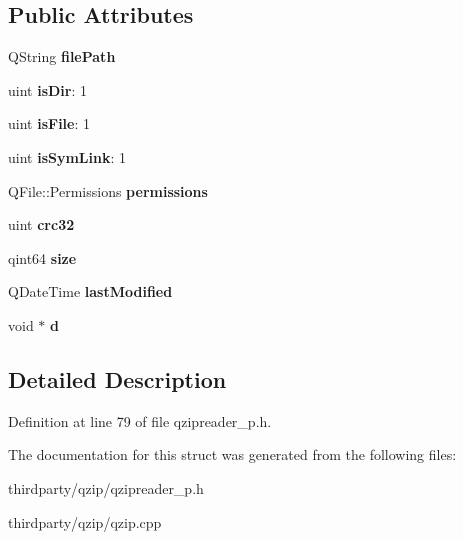 \subsection*{Public Attributes}
\begin{DoxyCompactItemize}
\item 
\mbox{\label{struct_m_q_zip_reader_1_1_file_info_a24b0d40e79c25b4dff99b345cae20b37}} 
Q\+String {\bfseries file\+Path}
\item 
\mbox{\label{struct_m_q_zip_reader_1_1_file_info_a605dfe4eaea865342967e710da5fcc3e}} 
uint {\bfseries is\+Dir}\+: 1
\item 
\mbox{\label{struct_m_q_zip_reader_1_1_file_info_a56b06e7adc978296966209241380faef}} 
uint {\bfseries is\+File}\+: 1
\item 
\mbox{\label{struct_m_q_zip_reader_1_1_file_info_a473414ed6a6d76b523057511a0c5818f}} 
uint {\bfseries is\+Sym\+Link}\+: 1
\item 
\mbox{\label{struct_m_q_zip_reader_1_1_file_info_a593579d29d6f3ac472352d2c2c1a8df6}} 
Q\+File\+::\+Permissions {\bfseries permissions}
\item 
\mbox{\label{struct_m_q_zip_reader_1_1_file_info_a084e35e00a4671ea44536cfd83ab51c2}} 
uint {\bfseries crc32}
\item 
\mbox{\label{struct_m_q_zip_reader_1_1_file_info_ad6fe7cc789885692c4e4216bfeeb6786}} 
qint64 {\bfseries size}
\item 
\mbox{\label{struct_m_q_zip_reader_1_1_file_info_aa105284ede976cd61f4533ff4547c90c}} 
Q\+Date\+Time {\bfseries last\+Modified}
\item 
\mbox{\label{struct_m_q_zip_reader_1_1_file_info_a5c3a9ff84904d73c9fae42106df976a5}} 
void $\ast$ {\bfseries d}
\end{DoxyCompactItemize}


\subsection{Detailed Description}


Definition at line 79 of file qzipreader\+\_\+p.\+h.



The documentation for this struct was generated from the following files\+:\begin{DoxyCompactItemize}
\item 
thirdparty/qzip/qzipreader\+\_\+p.\+h\item 
thirdparty/qzip/qzip.\+cpp\end{DoxyCompactItemize}
